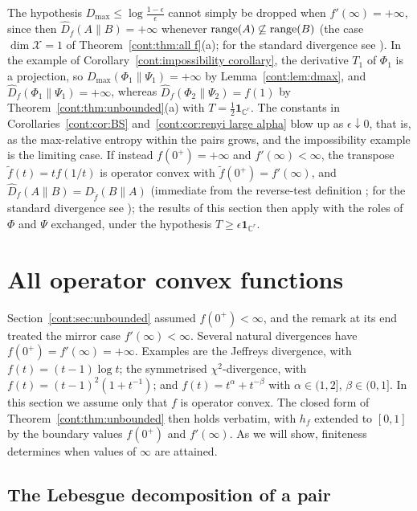 \begin{remark}
The hypothesis $D_{\max}\leq\log\frac{1-\epsilon}{\epsilon}$ cannot simply be dropped when $f'(\infty)=+\infty$, since then $\widehat{D}_f(A\|B)=+\infty$ whenever $\operatorname{range}(A)\not\subseteq\operatorname{range}(B)$ (the case $\dim\mathcal{X}=1$ of Theorem~\ref{cont:thm:all f}(a); for the standard divergence see \cite[Corollary~3.4]{HiaiMosonyi2017}). In the example of Corollary~\ref{cont:impossibility corollary}, the derivative $T_1$ of $\Phi_1$ is a projection, so $D_{\max}(\Phi_1\|\Psi_1)=+\infty$ by Lemma~\ref{cont:lem:dmax}, and $\widehat{D}_f(\Phi_1\|\Psi_1)=+\infty$, whereas $\widehat{D}_f(\Phi_2\|\Psi_2)=f(1)$ by Theorem~\ref{cont:thm:unbounded}(a) with $T=\frac12\mathbf{1}_{\mathbb{C}^r}$. The constants in Corollaries~\ref{cont:cor:BS} and~\ref{cont:cor:renyi large alpha} blow up as $\epsilon\downarrow0$, that is, as the max-relative entropy within the pairs grows, and the impossibility example is the limiting case. If instead $f(0^+)=+\infty$ and $f'(\infty)<\infty$, the transpose $\tilde f(t)=tf(1/t)$ is operator convex with $\tilde f(0^+)=f'(\infty)$, and $\widehat{D}_f(A\|B)=\widehat{D}_{\tilde f}(B\|A)$ (immediate from the reverse-test definition \cite{Matsumoto2018newf}; for the standard divergence see \cite[Proposition~3.7]{HiaiMosonyi2017}); the results of this section then apply with the roles of $\Phi$ and $\Psi$ exchanged, under the hypothesis $T\geq\epsilon\mathbf{1}_{\mathbb{C}^r}$.
\end{remark}

\section{All operator convex functions}\label{cont:sec:all f}

Section~\ref{cont:sec:unbounded} assumed $f(0^+)<\infty$, and the remark at its end treated the mirror case $f'(\infty)<\infty$. Several natural divergences have $f(0^+)=f'(\infty)=+\infty$. Examples are the Jeffreys divergence, with $f(t)=(t-1)\log t$; the symmetrised $\chi^2$-divergence, with $f(t)=(t-1)^2(1+t^{-1})$; and $f(t)=t^{\alpha}+t^{-\beta}$ with $\alpha\in(1,2]$, $\beta\in(0,1]$. In this section we assume only that $f$ is operator convex. The closed form of Theorem~\ref{cont:thm:unbounded} then holds verbatim, with $h_f$ extended to $[0,1]$ by the boundary values $f(0^+)$ and $f'(\infty)$. As we will show, finiteness determines when values of $\infty$ are attained.

\subsection{The Lebesgue decomposition of a pair}

